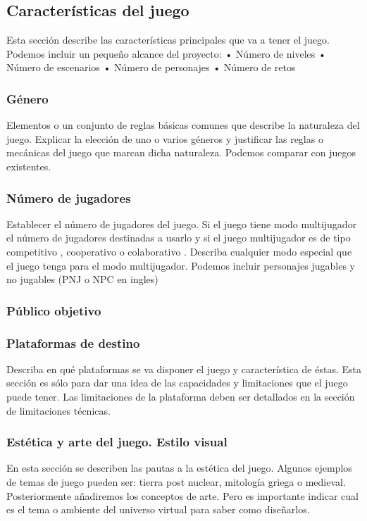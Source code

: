 \subsection{Características del juego}
Esta sección describe las características principales que va a tener el juego. Podemos incluir un pequeño alcance del proyecto:
•	Número de niveles
•	Número de escenarios
•	Número de personajes 
•	Número de retos

\subsubsection{Género}
Elementos o un conjunto de reglas básicas comunes que describe la naturaleza del juego. Explicar la elección de uno o varios géneros y justificar las reglas o mecánicas del juego que marcan dicha naturaleza. Podemos comparar con juegos existentes.

\subsubsection{Número de jugadores}
Establecer el número de jugadores del juego. Si el juego tiene modo multijugador el número de jugadores destinadas a usarlo y si el juego multijugador es de tipo competitivo , cooperativo o colaborativo . Describa cualquier modo especial que el juego tenga para el modo multijugador. Podemos incluir personajes jugables y no jugables (PNJ o NPC en ingles)

\subsubsection{Público objetivo}



\subsubsection{Plataformas de destino}
Describa en qué plataformas se va disponer el juego y característica de éstas. Esta sección es sólo para dar una idea de las capacidades y limitaciones que el juego puede tener. Las limitaciones de la plataforma deben ser detallados en la sección de limitaciones técnicas.


\subsubsection{Estética y arte del juego. Estilo visual}
En esta sección se describen las pautas a la estética del juego. Algunos ejemplos de temas de juego pueden ser: tierra post nuclear, mitología griega o medieval. Posteriormente añadiremos los conceptos de arte. Pero es importante indicar cual es el tema o ambiente del universo virtual para saber como diseñarlos.

